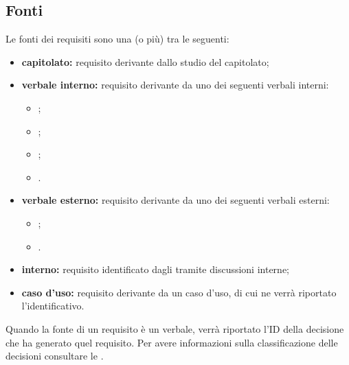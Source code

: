 \subsection{Fonti}
Le fonti dei requisiti sono una (o più) tra le seguenti:
	\begin{itemize}
		\item \textbf{capitolato:} requisito derivante dallo studio del capitolato;
		\item \textbf{verbale interno:} requisito derivante da uno dei seguenti verbali interni:
		\begin{itemize}
			\item \vunoi;
			\item \vduei;
			\item \vtrei;
			\item \vquattroi.
		\end{itemize}
	\item \textbf{verbale esterno:} requisito derivante da uno dei seguenti verbali esterni:
	\begin{itemize}
		\item \vunoe;
		\item \vduee.
	\end{itemize}
	\item \textbf{interno:} requisito identificato dagli \analisti{} tramite discussioni interne;
	\item \textbf{caso d'uso:} requisito derivante da un caso d'uso, di cui ne verrà riportato l'identificativo.
	\end{itemize}
	
	
	Quando la fonte di un requisito è un verbale, verrà riportato l'ID della decisione che ha generato quel requisito. Per avere informazioni sulla classificazione delle decisioni consultare le \ndpv.
	
